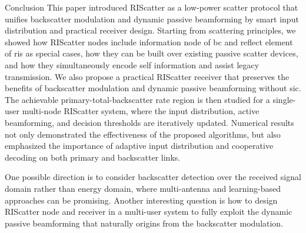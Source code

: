 \documentclass[journal]{IEEEtran}
\begin{document}
\begin{section}{Conclusion}
	This paper introduced RIScatter as a low-power scatter protocol that unifies backscatter modulation and dynamic passive beamforming by smart input distribution and practical receiver design.
	Starting from scattering principles, we showed how RIScatter nodes include information node of \gls{bc} and reflect element of \gls{ris} as special cases, how they can be built over existing passive scatter devices, and how they simultaneously encode self information and assist legacy transmission.
	We also propose a practical RIScatter receiver that preserves the benefits of backscatter modulation and dynamic passive beamforming without \gls{sic}.
	The achievable primary-total-backscatter rate region is then studied for a single-user multi-node RIScatter system, where the input distribution, active beamforming, and decision thresholds are iteratively updated.
	Numerical results not only demonstrated the effectiveness of the proposed algorithms, but also emphasized the importance of adaptive input distribution and cooperative decoding on both primary and backscatter links.

	One possible direction is to consider backscatter detection over the received signal domain rather than energy domain, where multi-antenna and learning-based approaches can be promising.
	Another interesting question is how to design RIScatter node and receiver in a multi-user system to fully exploit the dynamic passive beamforming that naturally origins from the backscatter modulation.
\end{section}
\end{document}
